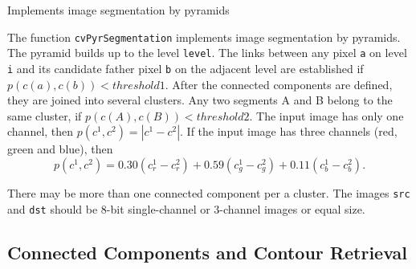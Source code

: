 \label{PyrSegmentation}

Implements image segmentation by pyramids


\begin{description}
\end{description}

The function \texttt{cvPyrSegmentation} implements image segmentation by pyramids. The pyramid builds up to the level \texttt{level}. The links between any pixel \texttt{a} on level \texttt{i} and its candidate father pixel \texttt{b} on the adjacent level are established if
$p(c(a),c(b))<threshold1$.
After the connected components are defined, they are joined into several clusters.
Any two segments A and B belong to the same cluster, if $p(c(A),c(B))<threshold2$.
The input image has only one channel, then $p(c^1,c^2)=|c^1-c^2|$.
If the input image has three channels (red, green and blue), then
\[
  p(c^1,c^2) = 0.30 (c^1_r - c^2_r) +
               0.59 (c^1_g - c^2_g) +
               0.11 (c^1_b - c^2_b).
\]

There may be more than one connected component per a cluster. The images \texttt{src} and \texttt{dst} should be 8-bit single-channel or 3-channel images or equal size.

\subsection{Connected Components and Contour Retrieval}

\label{CvConnectedComp}

